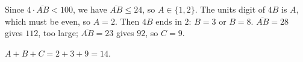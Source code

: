 Since $4\cdot\overline{AB}<100$, we have $\overline{AB}\le24$, so $A\in\{1,2\}$. The units digit of $4B$ is $A$, which must be even, so $A=2$. Then $4B$ ends in $2$: $B=3$ or $B=8$. $\overline{AB}=28$ gives $112$, too large; $\overline{AB}=23$ gives $92$, so $C=9$.

$A+B+C=2+3+9=\boxed{14}$.
